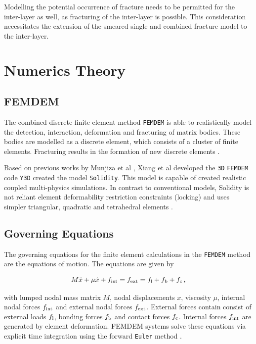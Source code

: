 \documentclass[12pt,twoside]{article}
\theoremstyle{break}
\begin{document}
\bigbreak
Modelling the potential occurrence of fracture needs to be permitted for the inter-layer as well, as fracturing of the inter-layer is possible. This consideration necessitates the extension of the smeared single and combined fracture model to the inter-layer.

\section{Numerics Theory}
\label{sec:NumericsTheory}

\subsection{FEMDEM}
The combined discrete finite element method \texttt{FEMDEM} \cite{Wan18, Mun95, Mun99, Mun04, Mun12, Mun13, Guo16, Gao14, Xu14, Che18} is able to realistically model the detection, interaction, deformation and fracturing of matrix bodies. These bodies are modelled as a discrete element, which consists of a cluster of finite elements. Fracturing results in the formation of new discrete elements \cite{Mun13}.

\bigbreak
Based on previous works by Munjiza et al \cite{Mun95, Mun99, Mun04}, Xiang et al \cite{Xia09} developed the \texttt{3D} \texttt{FEMDEM} code \texttt{Y3D} created the model \texttt{Solidity}. This model is capable of created realistic coupled multi-physics simulations. In contrast to conventional models, Solidity is not reliant element deformability restriction constraints (locking) and uses simpler triangular, quadratic and tetrahedral elements \cite{Lat15}. 

\subsection{Governing Equations}

The governing equations for the finite element calculations in the \texttt{FEMDEM} method are the equations of motion. The equations are given by

\begin{equation}
    M\ddot{x}+\mu\dot{x}+f_{\rm{int}}=f_{\rm{ext}}=f_{\rm{l}}+f_{\rm{b}}+f_{\rm{c}}\,,
\end{equation}

with lumped nodal mass matrix $M$, nodal displacements $x$, viscosity $\mu$, internal nodal forces $f_{\rm{int}}$ and external nodal forces $f_{\rm{ext}}$. External forces contain consist of external loads $f_{\rm{l}}$, bonding forces $f_{\rm{b}}$ and contact forces $f_{\rm{c}}$. Internal forces $f_{\rm{int}}$ are generated by element deformation. FEMDEM systems solve these equations via explicit time integration using the forward \texttt{Euler} method \cite{Lei16}.
\end{document}
